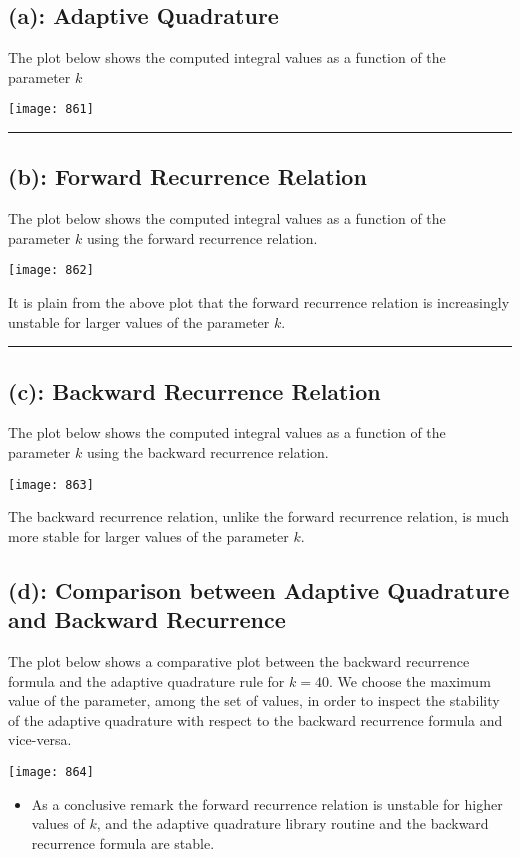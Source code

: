 \subsection*{(a): Adaptive Quadrature} The plot below shows the computed integral values as a function of the parameter $k$
\begin{center}
\texttt{[image: 861]}
\end{center}\hrule
\subsection*{(b): Forward Recurrence Relation}
The plot below shows the computed integral values as a function of the parameter $k$ using the forward recurrence relation. 
\begin{center}
\texttt{[image: 862]}
\end{center}
It is plain from the above plot that the forward recurrence relation is increasingly unstable for larger values of the parameter $k$. \\ \hrule\newpage
\subsection*{(c): Backward Recurrence Relation}
The plot below shows the computed integral values as a function of the parameter $k$ using the backward recurrence relation. 
\begin{center}
\texttt{[image: 863]}
\end{center}
The backward recurrence relation, unlike the forward recurrence relation, is much more stable for larger values of the parameter $k$.
\newpage\subsection*{(d): Comparison between Adaptive Quadrature and Backward Recurrence}
The plot below shows a comparative plot between the backward recurrence formula and the adaptive quadrature rule for $k=40$. We choose the maximum value of the parameter, among the set of values, in order to inspect the stability of the adaptive quadrature with respect to the backward recurrence formula and vice-versa. 
\begin{center}
\texttt{[image: 864]}
\end{center}
\begin{itemize}
\item As a conclusive remark the forward recurrence relation is unstable for higher values of $k$, and the adaptive quadrature library routine and the backward recurrence formula are stable. 
\end{itemize}
